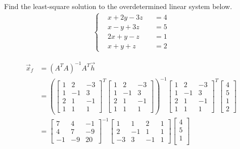\begin{Exercise}
Find the least-square solution to the overdetermined linear system below.
\begin{align*}
\left\{\begin{alignedat}{2}
&x + 2y - 3z &&= 4 \\
&x - y + 3z &&= 5 \\
&2x + y - z &&= 1 \\
&x + y + z &&= 2
\end{alignedat}\right.
\end{align*}
\end{Exercise}
\begin{Answer}
\begin{align*}
\vec{x}_f &= (A^TA)^{-1}A^T\vec{h} \\
&= 
\left(\begin{bmatrix}
1 & 2 & -3 \\
1 & -1 & 3 \\
2 & 1 & -1 \\
1 & 1 & 1
\end{bmatrix}^T
\begin{bmatrix}
1 & 2 & -3 \\
1 & -1 & 3 \\
2 & 1 & -1 \\
1 & 1 & 1
\end{bmatrix}\right)^{-1}
\begin{bmatrix}
1 & 2 & -3 \\
1 & -1 & 3 \\
2 & 1 & -1 \\
1 & 1 & 1
\end{bmatrix}^T
\begin{bmatrix}
4 \\
5 \\
1 \\
2
\end{bmatrix} \\
&=
\begin{bmatrix}
7&4&-1\\ 
4&7&-9\\ 
-1&-9&20
\end{bmatrix}^{-1}
\begin{bmatrix}
1 & 1 & 2 & 1 \\
2 & -1 & 1 & 1 \\
-3 & 3 & -1 & 1
\end{bmatrix}
\begin{bmatrix}
4 \\
5 \\
1 \\

\end{bmatrix}
\end{align*}
\end{Answer}
